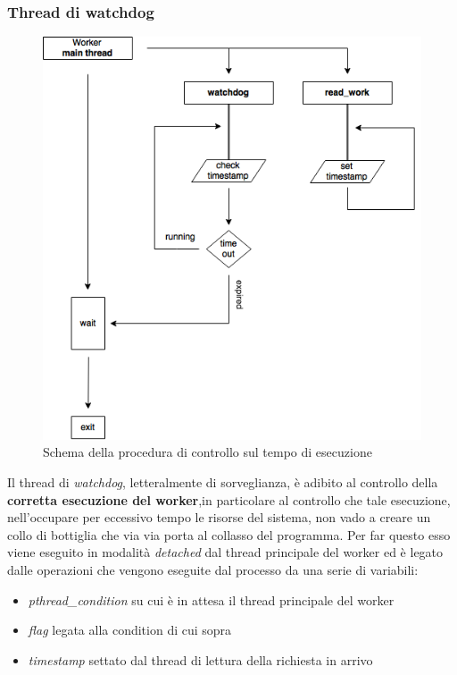 \documentclass[italian]{tktltiki2}
\begin{document}
\subsubsection{Thread di watchdog}
\label{sec:watchdog}
\begin{figure}[h]
\centering
\includegraphics[width=\textwidth]{images/watchdog}
\caption{Schema della procedura di controllo sul tempo di esecuzione \label{fig: watchdog}}
\end{figure}
Il thread di \emph{watchdog}, letteralmente di sorveglianza, è adibito al controllo della \textbf{corretta esecuzione del worker},in particolare al controllo che tale esecuzione, nell'occupare per eccessivo tempo le risorse del sistema, non vado a creare un collo di bottiglia che via via porta al collasso del programma. Per far questo esso viene eseguito in modalità \emph{detached} dal thread principale del worker ed è legato dalle operazioni che vengono eseguite dal processo da una serie di variabili: 
\begin{itemize}
	\item \emph{pthread\_condition} su cui è in attesa il thread principale del worker
	\item \emph{flag} legata alla condition di cui sopra
	\item \emph{timestamp} settato dal thread di lettura della richiesta in arrivo
\end{itemize}
\end{document}
